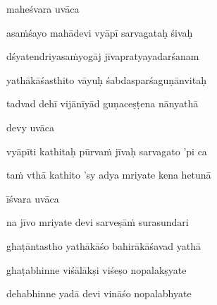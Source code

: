 maheśvara uvāca~{\dandab}\dontdisplaylinenum 

asa\.mśayo mahādevi vyāpī sarvagataḥ śivaḥ\thinspace{\danda} \dontdisplaylinenum

dśyatendriyasa\.myogāj jīvapratyayadarśanam \veg\dontdisplaylinenum

yathākāśasthito vāyuḥ śabdasparśaguṇānvitaḥ\thinspace{\dandab} \dontdisplaylinenum

tadvad dehī vijānīyād guṇaceṣṭena nānyathā \veg\dontdisplaylinenum

devy uvāca~{\dandab}\dontdisplaylinenum 

vyāpīti kathitaḥ pūrva\.m jīvaḥ sarvagato 'pi ca\thinspace{\danda} \dontdisplaylinenum

ta\.m vthā kathito 'sy adya mriyate kena hetunā \veg\dontdisplaylinenum

īśvara uvāca~{\dandab}\dontdisplaylinenum 

na jīvo mriyate devi sarveṣā\.m surasundari\thinspace{\danda} \dontdisplaylinenum

ghaṭāntastho yathākāśo bahirākāśavad yathā \veg\dontdisplaylinenum

ghaṭabhinne viśālākṣi viśeṣo nopalakṣyate\thinspace{\dandab} \dontdisplaylinenum

dehabhinne yadā devi vināśo nopalabhyate \veg\dontdisplaylinenum

